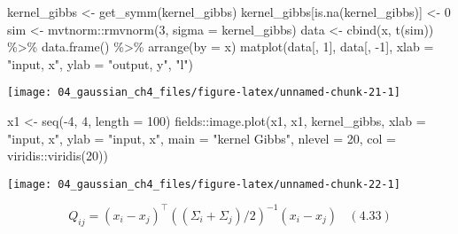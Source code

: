 \documentclass[
]{article}
\newenvironment{Shaded}{\begin{snugshade}}{\end{snugshade}}
\newcommand{\AttributeTok}[1]{\textcolor[rgb]{0.77,0.63,0.00}{#1}}
\newcommand{\DecValTok}[1]{\textcolor[rgb]{0.00,0.00,0.81}{#1}}
\newcommand{\FunctionTok}[1]{\textcolor[rgb]{0.00,0.00,0.00}{#1}}
\newcommand{\NormalTok}[1]{#1}
\newcommand{\OtherTok}[1]{\textcolor[rgb]{0.56,0.35,0.01}{#1}}
\newcommand{\SpecialCharTok}[1]{\textcolor[rgb]{0.00,0.00,0.00}{#1}}
\newcommand{\StringTok}[1]{\textcolor[rgb]{0.31,0.60,0.02}{#1}}
\begin{document}
\begin{Shaded}
\begin{Highlighting}[]
\NormalTok{kernel\_gibbs }\OtherTok{\textless{}{-}} \FunctionTok{get\_symm}\NormalTok{(kernel\_gibbs)}
\NormalTok{kernel\_gibbs[}\FunctionTok{is.na}\NormalTok{(kernel\_gibbs)] }\OtherTok{\textless{}{-}} \DecValTok{0}
\NormalTok{sim }\OtherTok{\textless{}{-}}\NormalTok{ mvtnorm}\SpecialCharTok{::}\FunctionTok{rmvnorm}\NormalTok{(}\DecValTok{3}\NormalTok{, }\AttributeTok{sigma =}\NormalTok{ kernel\_gibbs)}
\NormalTok{data }\OtherTok{\textless{}{-}} \FunctionTok{cbind}\NormalTok{(x, }\FunctionTok{t}\NormalTok{(sim)) }\SpecialCharTok{\%\textgreater{}\%} 
    \FunctionTok{data.frame}\NormalTok{() }\SpecialCharTok{\%\textgreater{}\%}
    \FunctionTok{arrange}\NormalTok{(}\AttributeTok{by =}\NormalTok{ x)}
\FunctionTok{matplot}\NormalTok{(data[, }\DecValTok{1}\NormalTok{], data[, }\SpecialCharTok{{-}}\DecValTok{1}\NormalTok{], }
        \AttributeTok{xlab =} \StringTok{"input, x"}\NormalTok{, }\AttributeTok{ylab =} \StringTok{"output, y"}\NormalTok{,}
        \StringTok{"l"}\NormalTok{)}
\end{Highlighting}
\end{Shaded}

\begin{center}\texttt{[image: 04\_gaussian\_ch4\_files/figure-latex/unnamed-chunk-21-1]} \end{center}

\begin{Shaded}
\begin{Highlighting}[]
\NormalTok{x1 }\OtherTok{\textless{}{-}} \FunctionTok{seq}\NormalTok{(}\SpecialCharTok{{-}}\DecValTok{4}\NormalTok{, }\DecValTok{4}\NormalTok{, }\AttributeTok{length =} \DecValTok{100}\NormalTok{)}
\NormalTok{fields}\SpecialCharTok{::}\FunctionTok{image.plot}\NormalTok{(x1, x1, kernel\_gibbs,}
\AttributeTok{xlab =} \StringTok{"input, x"}\NormalTok{,}
\AttributeTok{ylab =} \StringTok{"input, x\textquotesingle{}"}\NormalTok{,}
\AttributeTok{main =} \StringTok{"kernel Gibbs"}\NormalTok{,}
\AttributeTok{nlevel =} \DecValTok{20}\NormalTok{,}
\AttributeTok{col =}\NormalTok{ viridis}\SpecialCharTok{::}\FunctionTok{viridis}\NormalTok{(}\DecValTok{20}\NormalTok{))}
\end{Highlighting}
\end{Shaded}

\begin{center}\texttt{[image: 04\_gaussian\_ch4\_files/figure-latex/unnamed-chunk-22-1]} \end{center}

\[
Q_{ij} = (x_i - x_j)^{\top}((\Sigma_i + \Sigma_j)/2)^{-1}(x_i - x_j)
\ \ \ \ (4.33)
\]
\end{document}
